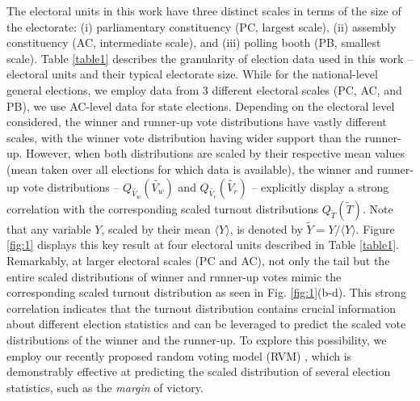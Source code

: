 \documentclass[reprint, pre, twocolumn, aps, showpacs, superscriptaddress]{revtex4-2}
\begin{document}
The electoral units in this work have three distinct scales in terms of the size of the electorate: (i) parliamentary constituency (PC, largest scale), (ii) assembly constituency (AC, intermediate scale), and (iii) polling booth (PB, smallest scale). Table \ref{table1} describes the granularity of election data used in this work -- electoral units and their typical electorate size. While for the national-level general elections, we employ data from 3 different electoral scales (PC, AC, and PB), we use AC-level data for state elections. Depending on the electoral level considered, the winner and runner-up vote distributions have vastly different scales, with the winner vote distribution having wider support than the runner-up. However, when both distributions are scaled by their respective mean values (mean taken over all elections for which data is available), the winner and runner-up vote distributions -- $Q_{\widetilde{V_w}}(\widetilde{V_w})$ and $Q_{\widetilde{V_r}}(\widetilde{V_r})$ -- explicitly display a strong correlation with the corresponding scaled turnout distributions $Q_{\widetilde{T}}(\widetilde{T})$. Note that any variable $Y$, scaled by their mean $\langle Y \rangle$, is denoted by $\widetilde{Y} = Y / \langle Y \rangle$. Figure \ref{fig:1} displays this key result at four electoral units described in Table \ref{table1}. Remarkably, at larger electoral scales (PC and AC), not only the tail but the entire scaled distributions of winner and runner-up votes mimic the corresponding scaled turnout distribution as seen in Fig. \ref{fig:1}(b-d). This strong correlation indicates that the turnout distribution contains crucial information about different election statistics and can be leveraged to predict the scaled vote distributions of the winner and the runner-up. To explore this possibility, we employ our recently proposed random voting model (RVM) \cite{pal2024universal}, which is demonstrably effective at predicting the scaled distribution of several election statistics, such as the \emph{margin} of victory.
\end{document}
